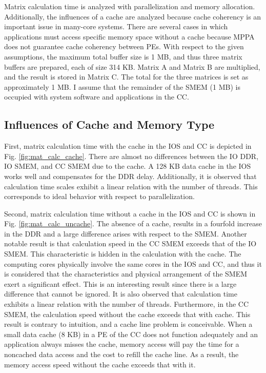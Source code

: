 Matrix calculation time is analyzed with parallelization and memory allocation.
Additionally, the influences of a cache are analyzed because cache coherency is an important issue in many-core systems.
There are several cases in which applications must access specific memory space without a cache because MPPA does not guarantee cache coherency between PEs.
With respect to the given assumptions, the maximum total buffer size is 1 MB, and thus three matrix buffers are prepared, each of size 314 KB.
Matrix A and Matrix B are multiplied, and the result is stored in Matrix C.
The total for the three matrices is set as approximately 1 MB.
I assume that the remainder of the SMEM (1 MB) is occupied with system software and applications in the CC.

\subsection{Influences of Cache and Memory Type}
\label{sec:cache_and_memory}
First, matrix calculation time with the cache in the IOS and CC is depicted in Fig. \ref{fig:mat_calc_cache}.
There are almost no differences between the IO DDR, IO SMEM, and CC SMEM due to the cache.
A 128 KB data cache in the IOS works well and compensates for the DDR delay.
Additionally, it is observed that calculation time scales exhibit a linear relation with the number of threads.
This corresponds to ideal behavior with respect to parallelization.

Second, matrix calculation time without a cache in the IOS and CC is shown in Fig. \ref{fig:mat_calc_uncache}.
The absence of a cache, results in a fourfold increase in the DDR and a large difference arises with respect to the SMEM.
Another notable result is that calculation speed in the CC SMEM exceeds that of the IO SMEM.
This characteristic is hidden in the calculation with the cache.
The computing cores physically involve the same cores in the IOS and CC, and thus it is considered that the characteristics and physical arrangement of the SMEM exert a significant effect.
This is an interesting result since there is a large difference that cannot be ignored.
It is also observed that calculation time exhibits a linear relation with the number of threads.
Furthermore, in the CC SMEM, the calculation speed without the cache exceeds that with cache.
This result is contrary to intuition, and a cache line problem is conceivable.
When a small data cache (8 KB) in a PE of the CC does not function adequately and an application always misses the cache, memory access will pay the time for a noncached data access and the cost to refill the cache line.
As a result, the memory access speed without the cache exceeds that with it.

